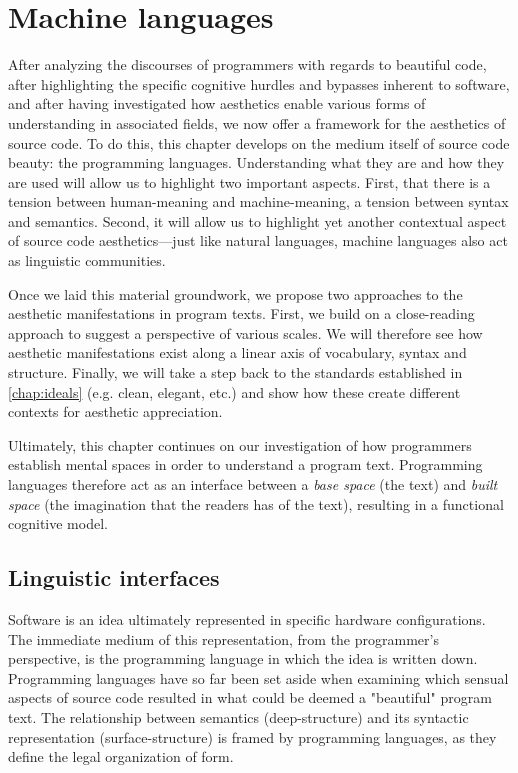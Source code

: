 \chapter{Machine languages}
\label{chap:programming}

After analyzing the discourses of programmers with regards to beautiful code, after highlighting the specific cognitive hurdles and bypasses inherent to software, and after having investigated how aesthetics enable various forms of understanding in associated fields, we now offer a framework for the aesthetics of source code. To do this, this chapter develops on the medium itself of source code beauty: the programming languages. Understanding what they are and how they are used will allow us to highlight two important aspects. First, that there is a tension between human-meaning and machine-meaning, a tension between syntax and semantics. Second, it will allow us to highlight yet another contextual aspect of source code aesthetics—just like natural languages, machine languages also act as linguistic communities.

Once we laid this material groundwork, we propose two approaches to the aesthetic manifestations in program texts. First, we build on a close-reading approach to suggest a perspective of various scales. We will therefore see how aesthetic manifestations exist along a linear axis of vocabulary, syntax and structure. Finally, we will take a step back to the standards established in \ref{chap:ideals} (e.g. clean, elegant, etc.) and show how these create different contexts for aesthetic appreciation.

Ultimately, this chapter continues on our investigation of how programmers establish mental spaces in order to understand a program text. Programming languages therefore act as an interface between a \emph{base space} (the text) and \emph{built space} (the imagination that the readers has of the text), resulting in a functional cognitive model.

\section{Linguistic interfaces}
\label{sec:linguistic-interfaces}

Software is an idea ultimately represented in specific hardware configurations. The immediate medium of this representation, from the programmer's perspective, is the programming language in which the idea is written down. Programming languages have so far been set aside when examining which sensual aspects of source code resulted in what could be deemed a "beautiful" program text. The relationship between semantics (deep-structure)  and its syntactic representation (surface-structure) is framed by programming languages, as they define the legal organization of form.

